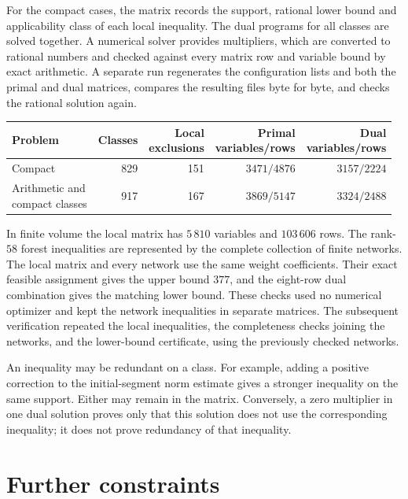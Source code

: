 \documentclass[11pt]{article}
\theoremstyle{definition}
\theoremstyle{remark}
\numberwithin{equation}{section}
\begin{document}
For the compact cases, the matrix records the support, rational lower
bound and applicability class of each local inequality. The dual
programs for all classes are solved together. A numerical solver
provides multipliers, which are converted to rational numbers and
checked against every matrix row and variable bound by exact
arithmetic. A separate run regenerates the configuration lists and
both the primal and dual matrices, compares the resulting files
byte for byte, and checks the rational solution again.

\begin{center}\small
\begin{tabular}{lrrrr}
\toprule
Problem&Classes&\shortstack{Local\\exclusions}&
\shortstack{Primal\\variables/rows}&\shortstack{Dual\\variables/rows}\\
\midrule
Compact&829&151&$3471/4876$&$3157/2224$\\
\shortstack[l]{Arithmetic and\\compact classes}&917&167&$3869/5147$&$3324/2488$\\
\bottomrule
\end{tabular}
\end{center}

In finite volume the local matrix has $5\,810$ variables and
$103\,606$ rows. The rank-$58$ forest inequalities are represented
by the complete collection of finite networks. The local matrix
and every network use the same weight coefficients. Their exact
feasible assignment gives the upper bound $377$, and the eight-row
dual combination gives the matching lower bound. These checks
used no numerical optimizer and kept the network inequalities in
separate matrices. The subsequent verification repeated the local
inequalities, the completeness checks joining the networks, and
the lower-bound certificate, using the previously checked networks.

An inequality may be redundant on a class. For example, adding a
positive correction to the initial-segment norm estimate gives a
stronger inequality on the same support. Either may remain in the
matrix. Conversely, a zero multiplier in one dual solution proves
only that this solution does not use the corresponding inequality;
it does not prove redundancy of that inequality.

\section{Further constraints}
\label{sec:strengthening}
\end{document}
